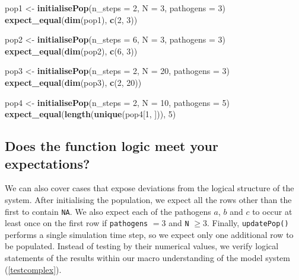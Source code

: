\documentclass[]{elsarticle} %
\newenvironment{Shaded}{\begin{snugshade}}{\end{snugshade}}
\newcommand{\DataTypeTok}[1]{\textcolor[rgb]{0.13,0.29,0.53}{#1}}
\newcommand{\DecValTok}[1]{\textcolor[rgb]{0.00,0.00,0.81}{#1}}
\newcommand{\KeywordTok}[1]{\textcolor[rgb]{0.13,0.29,0.53}{\textbf{#1}}}
\newcommand{\NormalTok}[1]{#1}
\newcommand{\StringTok}[1]{\textcolor[rgb]{0.31,0.60,0.02}{#1}}
\begin{document}
\begin{Shaded}
\begin{Highlighting}[]
\NormalTok{pop1 <-}\StringTok{ }\KeywordTok{initialisePop}\NormalTok{(}\DataTypeTok{n_steps =} \DecValTok{2}\NormalTok{, }\DataTypeTok{N =} \DecValTok{3}\NormalTok{, }\DataTypeTok{pathogens =} \DecValTok{3}\NormalTok{) }
\KeywordTok{expect_equal}\NormalTok{(}\KeywordTok{dim}\NormalTok{(pop1), }\KeywordTok{c}\NormalTok{(}\DecValTok{2}\NormalTok{, }\DecValTok{3}\NormalTok{))}

\NormalTok{pop2 <-}\StringTok{ }\KeywordTok{initialisePop}\NormalTok{(}\DataTypeTok{n_steps =} \DecValTok{6}\NormalTok{, }\DataTypeTok{N =} \DecValTok{3}\NormalTok{, }\DataTypeTok{pathogens =} \DecValTok{3}\NormalTok{) }
\KeywordTok{expect_equal}\NormalTok{(}\KeywordTok{dim}\NormalTok{(pop2), }\KeywordTok{c}\NormalTok{(}\DecValTok{6}\NormalTok{, }\DecValTok{3}\NormalTok{))}

\NormalTok{pop3 <-}\StringTok{ }\KeywordTok{initialisePop}\NormalTok{(}\DataTypeTok{n_steps =} \DecValTok{2}\NormalTok{, }\DataTypeTok{N =} \DecValTok{20}\NormalTok{, }\DataTypeTok{pathogens =} \DecValTok{3}\NormalTok{) }
\KeywordTok{expect_equal}\NormalTok{(}\KeywordTok{dim}\NormalTok{(pop3), }\KeywordTok{c}\NormalTok{(}\DecValTok{2}\NormalTok{, }\DecValTok{20}\NormalTok{))}

\NormalTok{pop4 <-}\StringTok{ }\KeywordTok{initialisePop}\NormalTok{(}\DataTypeTok{n_steps =} \DecValTok{2}\NormalTok{, }\DataTypeTok{N =} \DecValTok{10}\NormalTok{, }\DataTypeTok{pathogens =} \DecValTok{5}\NormalTok{) }
\KeywordTok{expect_equal}\NormalTok{(}\KeywordTok{length}\NormalTok{(}\KeywordTok{unique}\NormalTok{(pop4[}\DecValTok{1}\NormalTok{, ])), }\DecValTok{5}\NormalTok{)}
\end{Highlighting}
\end{Shaded}

\hypertarget{complexcases}{%
\subsection*{Does the function logic meet your expectations?}\label{complexcases}}

We can also cover cases that expose deviations from the logical structure of the system.
After initialising the population, we expect all the rows other than the first to contain \texttt{NA}.
We also expect each of the pathogens \(a\), \(b\) and \(c\) to occur at least once on the first row if \texttt{pathogens} \(= 3\) and \texttt{N} \(\geq 3\).
Finally, \texttt{updatePop()} performs a single simulation time step, so we expect only one additional row to be populated.
Instead of testing by their numerical values, we verify logical statements of the results within our macro understanding of the model system (\ref{testcomplex}).
\newline
{}\label{testcomplex}
\end{document}

